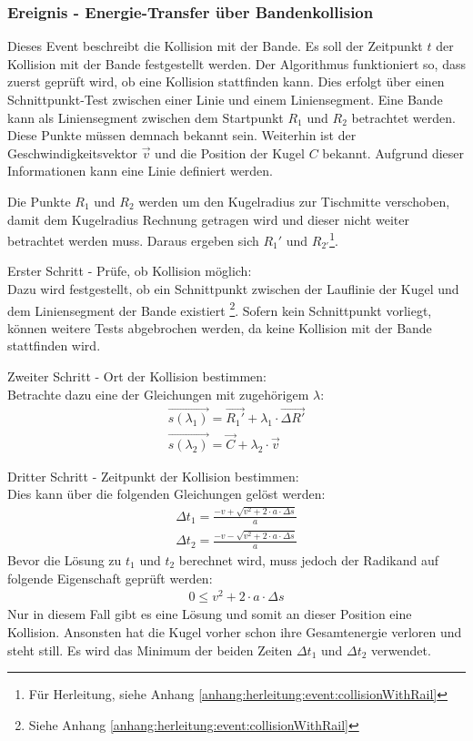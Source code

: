 \subsubsection{Ereignis - Energie-Transfer über Bandenkollision}
Dieses Event beschreibt die Kollision mit der Bande. Es soll der Zeitpunkt $t$ der Kollision mit der Bande festgestellt werden.
Der Algorithmus funktioniert so, dass zuerst geprüft wird, ob eine Kollision stattfinden kann.
Dies erfolgt über einen Schnittpunkt-Test zwischen einer Linie und einem Liniensegment.
Eine Bande kann als Liniensegment zwischen dem Startpunkt $R_1$ und $R_2$ betrachtet werden. Diese Punkte müssen demnach bekannt sein.
Weiterhin ist der Geschwindigkeitsvektor $\vec{v}$ und die Position der Kugel $C$ bekannt.
Aufgrund dieser Informationen kann eine Linie definiert werden.

Die Punkte $R_1$ und $R_2$ werden um den Kugelradius zur Tischmitte verschoben,
damit dem Kugelradius Rechnung getragen wird und dieser nicht weiter betrachtet werden muss.
Daraus ergeben sich $R_1'$ und $R_{2'}$\footnote{Für Herleitung, siehe Anhang \ref{anhang:herleitung:event:collisionWithRail}}.

Erster Schritt - Prüfe, ob Kollision möglich:\\
Dazu wird festgestellt, ob ein Schnittpunkt zwischen der Lauflinie der Kugel und dem Liniensegment der
Bande existiert \footnote{Siehe Anhang \ref{anhang:herleitung:event:collisionWithRail}}.
Sofern kein Schnittpunkt vorliegt, können weitere Tests abgebrochen werden, da keine Kollision mit der Bande stattfinden wird.

Zweiter Schritt - Ort der Kollision bestimmen:\\
Betrachte dazu eine der Gleichungen mit zugehörigem $\lambda$:
\begin{align}
    \vec{s(\lambda_1)} = \vec{R_1'} + \lambda_1 \cdot \vec{\Delta R'}\\
    \vec{s(\lambda_2)} = \vec{C} + \lambda_2 \cdot \vec{v}
\end{align}

Dritter Schritt - Zeitpunkt der Kollision bestimmen:\\
Dies kann über die folgenden Gleichungen gelöst werden:
\begin{align}
    \Delta t_1 = \frac{-v + \sqrt{v^2 + 2 \cdot a \cdot \Delta s}}{a}\\
    \Delta t_2 = \frac{-v - \sqrt{v^2 + 2 \cdot a \cdot \Delta s}}{a}
\end{align}
Bevor die Lösung zu $t_1$ und $t_2$ berechnet wird, muss jedoch der Radikand auf folgende Eigenschaft geprüft werden:
\begin{align}
    0 \leq v^2 + 2 \cdot a \cdot \Delta s
\end{align}
Nur in diesem Fall gibt es eine Lösung und somit an dieser Position eine Kollision. Ansonsten hat die Kugel vorher schon
ihre Gesamtenergie verloren und steht still. Es wird das Minimum der beiden Zeiten $\Delta t_1$ und $\Delta t_2$ verwendet.

